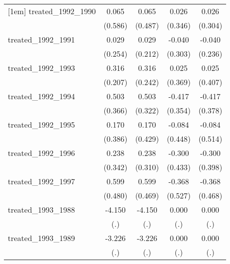 {\begin{tabular}{l*{4}{c}}
[1em]
treated\_1992\_1990&       0.065         &       0.065         &       0.026         &       0.026         \\
            &     (0.586)         &     (0.487)         &     (0.346)         &     (0.304)         \\
[1em]
treated\_1992\_1991&       0.029         &       0.029         &      -0.040         &      -0.040         \\
            &     (0.254)         &     (0.212)         &     (0.303)         &     (0.236)         \\
[1em]
treated\_1992\_1993&       0.316         &       0.316         &       0.025         &       0.025         \\
            &     (0.207)         &     (0.242)         &     (0.369)         &     (0.407)         \\
[1em]
treated\_1992\_1994&       0.503         &       0.503         &      -0.417         &      -0.417         \\
            &     (0.366)         &     (0.322)         &     (0.354)         &     (0.378)         \\
[1em]
treated\_1992\_1995&       0.170         &       0.170         &      -0.084         &      -0.084         \\
            &     (0.386)         &     (0.429)         &     (0.448)         &     (0.514)         \\
[1em]
treated\_1992\_1996&       0.238         &       0.238         &      -0.300         &      -0.300         \\
            &     (0.342)         &     (0.310)         &     (0.433)         &     (0.398)         \\
[1em]
treated\_1992\_1997&       0.599         &       0.599         &      -0.368         &      -0.368         \\
            &     (0.480)         &     (0.469)         &     (0.527)         &     (0.468)         \\
[1em]
treated\_1993\_1988&      -4.150         &      -4.150         &       0.000         &       0.000         \\
            &         (.)         &         (.)         &         (.)         &         (.)         \\
[1em]
treated\_1993\_1989&      -3.226         &      -3.226         &       0.000         &       0.000         \\
            &         (.)         &         (.)         &         (.)         &         (.)         \\

\end{tabular}}
